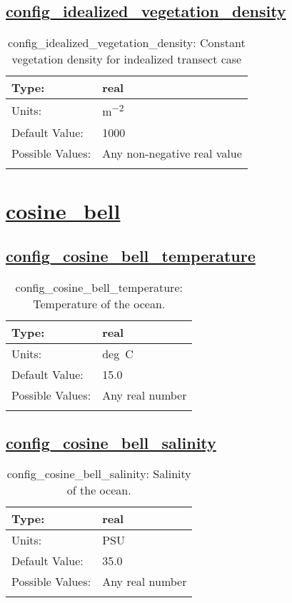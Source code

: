 \subsection[config\_idealized\_vegetation\_density]{\hyperref[sec:nm_tab_tidal_boundary]{config\_idealized\_vegetation\_density}}
\label{subsec:nm_sec_config_idealized_vegetation_density}
\begin{center}
\begin{longtable}{| p{2.0in} || p{4.0in} |}
    \hline
    Type: & real \\
    \hline
    Units: & \si{m^{-2}} \\
    \hline
    Default Value: & 1000 \\
    \hline
    Possible Values: & Any non-negative real value \\
    \hline
    \caption{config\_idealized\_vegetation\_density: Constant vegetation density for indealized transect case}
\end{longtable}
\end{center}
\section[cosine\_bell]{\hyperref[sec:nm_tab_cosine_bell]{cosine\_bell}}
\label{sec:nm_sec_cosine_bell}
\subsection[config\_cosine\_bell\_temperature]{\hyperref[sec:nm_tab_cosine_bell]{config\_cosine\_bell\_temperature}}
\label{subsec:nm_sec_config_cosine_bell_temperature}
\begin{center}
\begin{longtable}{| p{2.0in} || p{4.0in} |}
    \hline
    Type: & real \\
    \hline
    Units: & \si{deg.C} \\
    \hline
    Default Value: & 15.0 \\
    \hline
    Possible Values: & Any real number \\
    \hline
    \caption{config\_cosine\_bell\_temperature: Temperature of the ocean.}
\end{longtable}
\end{center}
\subsection[config\_cosine\_bell\_salinity]{\hyperref[sec:nm_tab_cosine_bell]{config\_cosine\_bell\_salinity}}
\label{subsec:nm_sec_config_cosine_bell_salinity}
\begin{center}
\begin{longtable}{| p{2.0in} || p{4.0in} |}
    \hline
    Type: & real \\
    \hline
    Units: & \si{PSU} \\
    \hline
    Default Value: & 35.0 \\
    \hline
    Possible Values: & Any real number \\
    \hline
    \caption{config\_cosine\_bell\_salinity: Salinity of the ocean.}
\end{longtable}
\end{center}
